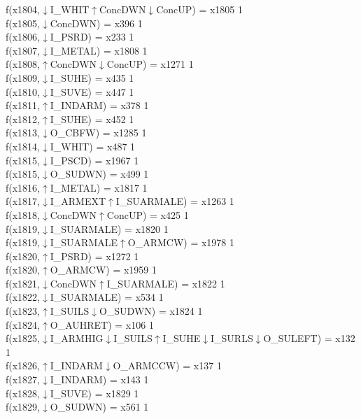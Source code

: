 f(x1804,$\downarrow$I\_WHIT$\uparrow$ConcDWN$\downarrow$ConcUP) = x1805 {1} \\
f(x1805,$\downarrow$ConcDWN) = x396 {1} \\
f(x1806,$\downarrow$I\_PSRD) = x233 {1} \\
f(x1807,$\downarrow$I\_METAL) = x1808 {1} \\
f(x1808,$\uparrow$ConcDWN$\downarrow$ConcUP) = x1271 {1} \\
f(x1809,$\downarrow$I\_SUHE) = x435 {1} \\
f(x1810,$\downarrow$I\_SUVE) = x447 {1} \\
f(x1811,$\uparrow$I\_INDARM) = x378 {1} \\
f(x1812,$\uparrow$I\_SUHE) = x452 {1} \\
f(x1813,$\downarrow$O\_CBFW) = x1285 {1} \\
f(x1814,$\downarrow$I\_WHIT) = x487 {1} \\
f(x1815,$\downarrow$I\_PSCD) = x1967 {1} \\
f(x1815,$\downarrow$O\_SUDWN) = x499 {1} \\
f(x1816,$\uparrow$I\_METAL) = x1817 {1} \\
f(x1817,$\downarrow$I\_ARMEXT$\uparrow$I\_SUARMALE) = x1263 {1} \\
f(x1818,$\downarrow$ConcDWN$\uparrow$ConcUP) = x425 {1} \\
f(x1819,$\downarrow$I\_SUARMALE) = x1820 {1} \\
f(x1819,$\downarrow$I\_SUARMALE$\uparrow$O\_ARMCW) = x1978 {1} \\
f(x1820,$\uparrow$I\_PSRD) = x1272 {1} \\
f(x1820,$\uparrow$O\_ARMCW) = x1959 {1} \\
f(x1821,$\downarrow$ConcDWN$\uparrow$I\_SUARMALE) = x1822 {1} \\
f(x1822,$\downarrow$I\_SUARMALE) = x534 {1} \\
f(x1823,$\uparrow$I\_SUILS$\downarrow$O\_SUDWN) = x1824 {1} \\
f(x1824,$\uparrow$O\_AUHRET) = x106 {1} \\
f(x1825,$\downarrow$I\_ARMHIG$\downarrow$I\_SUILS$\uparrow$I\_SUHE$\downarrow$I\_SURLS$\downarrow$O\_SULEFT) = x132 {1} \\
f(x1826,$\uparrow$I\_INDARM$\downarrow$O\_ARMCCW) = x137 {1} \\
f(x1827,$\downarrow$I\_INDARM) = x143 {1} \\
f(x1828,$\downarrow$I\_SUVE) = x1829 {1} \\
f(x1829,$\downarrow$O\_SUDWN) = x561 {1} \\
